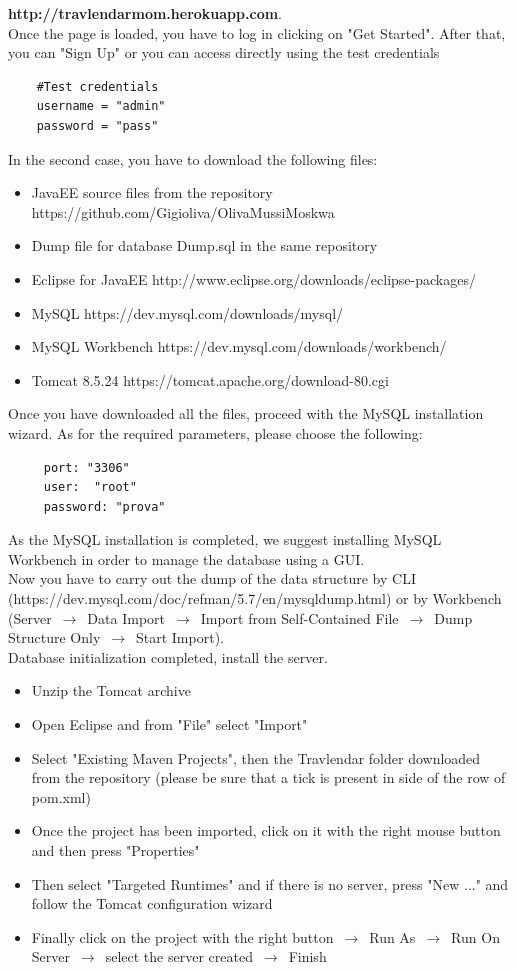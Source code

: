 \documentclass[numbers=noenddot, 12pt, a4paper, oneside]{scrbook}
\begin{document}
\textbf{http://travlendarmom.herokuapp.com}.\\

Once the page is loaded, you have to log in clicking on "Get Started". After that, you can "Sign Up" or you can access directly using the test credentials
\begin{lstlisting}
	#Test credentials
	username = "admin"
	password = "pass"
\end{lstlisting}

In the second case, you have to download the following files:
\begin{itemize}
	\item JavaEE source files from the repository https://github.com/Gigioliva/OlivaMussiMoskwa
	\item Dump file for database Dump.sql in the same repository
	\item Eclipse for JavaEE http://www.eclipse.org/downloads/eclipse-packages/
	\item MySQL https://dev.mysql.com/downloads/mysql/
	\item MySQL Workbench https://dev.mysql.com/downloads/workbench/
	\item Tomcat 8.5.24 https://tomcat.apache.org/download-80.cgi
\end{itemize}
Once you have downloaded all the files, proceed with the MySQL installation wizard. As for the required parameters, please choose the following:
\begin{lstlisting}
	 port: "3306"
	 user:  "root"
	 password: "prova"
\end{lstlisting}

As the MySQL installation is completed, we suggest installing MySQL Workbench in order to manage the database using a GUI. \\
Now you have to carry out the dump of the data structure by CLI\\
(https://dev.mysql.com/doc/refman/5.7/en/mysqldump.html)
or by Workbench (Server $\,\to\,$ Data Import $\,\to\,$ Import from Self-Contained File $\,\to\,$ Dump Structure Only $\,\to\,$ Start Import).\\

Database initialization completed, install the server.

\begin{itemize}
	\item Unzip the Tomcat archive
	\item Open Eclipse and from "File" select "Import"
	\item Select "Existing Maven Projects", then the Travlendar folder downloaded from the repository (please be sure that a tick is present in side of the row of pom.xml)
	\item Once the project has been imported, click on it with the right mouse button and then press "Properties"
	\item Then select "Targeted Runtimes" and if there is no server, press "New ..." and follow the Tomcat configuration wizard
	\item Finally click on the project with the right button $\,\to\,$  Run As $\,\to\,$ Run On Server $\,\to\,$ select the server created $\,\to\,$ Finish
\end{itemize}
\end{document}
